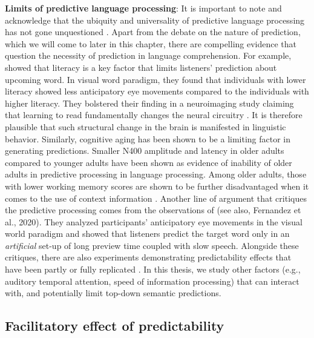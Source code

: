 \documentclass[a4paper, nobind]{templates/ociamthesis}
\begin{document}
\textbf{Limits of predictive language processing}:
It is important to note and acknowledge that the ubiquity and universality of predictive language processing has not gone unquestioned \autocite{Huettig2016}.
Apart from the debate on the nature of prediction, which we will come to later in this chapter, there are compelling evidence that question the necessity of prediction in language comprehension.
For example, \textcite{Mishra2012} showed that literacy is a key factor that limits listeners' prediction about upcoming word.
In visual word paradigm, they found that individuals with lower literacy showed less anticipatory eye movements compared to the individuals with higher literacy.
They bolstered their finding in a neuroimaging study claiming that learning to read fundamentally changes the neural circuitry \autocite{Hervais2019}.
It is therefore plausible that such structural change in the brain is manifested in linguistic behavior.
Similarly, cognitive aging has been shown to be a limiting factor in generating predictions.
Smaller N400 amplitude and latency in older adults compared to younger adults have been shown as evidence of inability of older adults in predictive processing in language processing.
Among older adults, those with lower working memory scores are shown to be further disadvantaged when it comes to the use of context information \autocite{Federmeier2002,Federmeier2010}.
Another line of argument that critiques the predictive processing comes from the observations of \textcite{Huettig2019} (see also, Fernandez et al., 2020).
They analyzed participants' anticipatory eye movements in the visual world paradigm and showed that listeners predict the target word only in an \emph{artificial} set-up of long preview time coupled with slow speech.
Alongside these critiques, there are also experiments demonstrating predictability effects that have been partly or fully replicated \autocites[e.g.,][]{Nieuwland2018,Ankener2019}.
In this thesis, we study other factors (e.g., auditory temporal attention, speed of information processing) that can interact with, and potentially limit top-down semantic predictions.

\hypertarget{facilitatory-effect-of-predictability}{%
\subsection{Facilitatory effect of predictability}\label{facilitatory-effect-of-predictability}}
\end{document}
